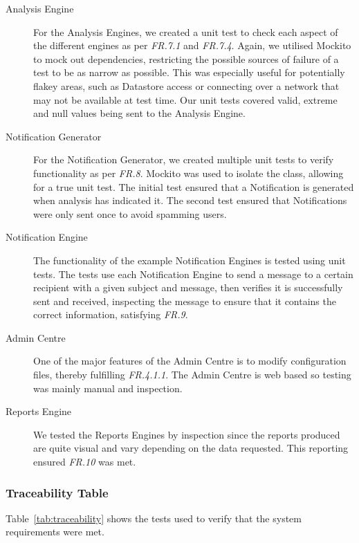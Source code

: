 \documentclass[10pt,a4paper]{article}
\begin{document}
\begin{description}
  \item[Analysis Engine] For the Analysis Engines, we created a unit test to check each aspect of the different engines as per \emph{FR.7.1} and \emph{FR.7.4}. Again, we utilised Mockito to mock out dependencies, restricting the possible sources of failure of a test to be as narrow as possible. This was especially useful for potentially flakey areas, such as Datastore access or connecting over a network that may not be available at test time. Our unit tests covered valid, extreme and null values being sent to the Analysis Engine.

  \item[Notification Generator] For the Notification Generator, we created multiple unit tests to verify functionality as per \emph{FR.8}. Mockito was used to isolate the class, allowing for a true unit test. The initial test ensured that a Notification is generated when analysis has indicated it. The second test ensured that Notifications were only sent once to avoid spamming users.

  \item[Notification Engine] The functionality of the example Notification Engines is tested using unit tests. The tests use each Notification Engine to send a message to a certain recipient with a given subject and message, then verifies it is successfully sent and received, inspecting the message to ensure that it contains the correct information, satisfying \emph{FR.9}.

  \item[Admin Centre] One of the major features of the Admin Centre is to modify configuration files, thereby fulfilling \emph{FR.4.1.1}. The Admin Centre is web based so testing was mainly manual and inspection.

  \item[Reports Engine] We tested the Reports Engines by inspection since the reports produced are quite visual and vary depending on the data requested. This reporting ensured \emph{FR.10} was met.

\end{description}

\subsubsection{Traceability Table}

Table~\ref{tab:traceability} shows the tests used to verify that the system requirements were met.
\end{document}
